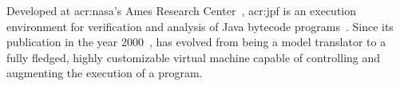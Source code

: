 






Developed at \acrshort{acr:nasa}'s Ames Research Center~\cite{WebNASAAmes2017}, \acrfull{acr:jpf} is an execution environment for verification and analysis of Java bytecode programs~\cite{Visser2003,WebJPF2017}. Since its publication in the year 2000~\cite{Havelund2000}, \jpf has evolved from being a model translator to a fully fledged, highly customizable virtual machine capable of controlling and augmenting the execution of a program.

